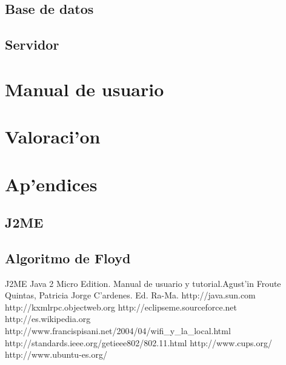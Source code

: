 \documentclass[a4paper,12pt]{article}
\begin{document}
	\subsection{Base de datos}
		

	\subsection{Servidor}
		


\pagebreak

\section{Manual de usuario}
		

\pagebreak

\section{Valoraci'on}

\pagebreak

\section{Ap'endices}

	\subsection{J2ME}
		


	\subsection{Algoritmo de Floyd}

\pagebreak

\begin{thebibliography}{XXX}

	J2ME Java 2 Micro Edition. Manual de usuario y tutorial.Agust'in Froute Quintas, Patricia Jorge C'ardenes. Ed. Ra-Ma.
	http://java.sun.com
	http://kxmlrpc.objectweb.org
	  http://eclipseme.sourceforce.net
	 http://es.wikipedia.org
	http://www.francispisani.net/2004/04/wifi_y_la_local.html
	http://standards.ieee.org/getieee802/802.11.html
	http://www.cups.org/
	http://www.ubuntu-es.org/

\end{thebibliography}
\end{document}
